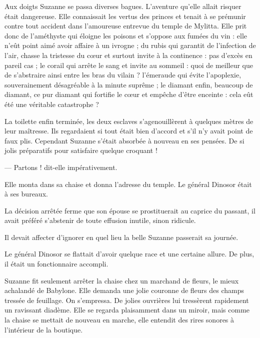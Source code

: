 \documentclass[a4paper, 11pt, oneside, polutonikogreek, french]{article}
\begin{document}
Aux doigts Suzanne se passa diverses bagues. L'aventure qu'elle allait risquer était dangereuse. Elle connaissait les vertus des princes et tenait à se prémunir contre tout accident dans l'amoureuse entrevue du temple de Mylitta. Elle prit donc de l'améthyste qui éloigne les poisons et s'oppose aux fumées du vin : elle n'eût point aimé avoir affaire à un ivrogne ; du rubis qui garantit de l'infection de l'air, chasse la tristesse du cœur et surtout invite à la continence : pas d'excès en pareil cas ; le corail qui arrête le sang et invite au sommeil : quoi de meilleur que de s'abstraire ainsi entre les bras du vilain ? l'émeraude qui évite l'apoplexie, souverainement désagréable à la minute suprême ; le diamant enfin, beaucoup de diamant, ce pur diamant qui fortifie le cœur et empêche d'être enceinte : cela eût été une véritable catastrophe ?

\bigskip
\centerline{\EightStarTaper}
\centerline{\EightStarTaper\EightStarTaper}
\bigskip

La toilette enfin terminée, les deux esclaves s'agenouillèrent à quelques mètres de leur maîtresse. Ils regardaient si tout était bien d'accord et s'il n'y avait point de faux plis. Cependant Suzanne s'était absorbée à nouveau en ses pensées. De si jolis préparatifs pour satisfaire quelque croquant !

--- Partons ! dit-elle impérativement.

\bigskip
\centerline{\EightStarTaper}
\centerline{\EightStarTaper\EightStarTaper}
\bigskip

Elle monta dans sa chaise et donna l'adresse du temple. Le général Dinosor était à ses bureaux.

La décision arrêtée ferme que son épouse se prostituerait au caprice du passant, il avait préféré s'abstenir de toute effusion inutile, sinon ridicule.

Il devait affecter d'ignorer en quel lieu la belle Suzanne passerait sa journée.

Le général Dinosor se flattait d'avoir quelque race et une certaine allure. De plus, il était un fonctionnaire accompli.

\bigskip
\centerline{\EightStarTaper}
\centerline{\EightStarTaper\EightStarTaper}
\bigskip

Suzanne fit seulement arrêter la chaise chez un marchand de fleurs, le mieux achalandé de Babylone. Elle demanda une jolie couronne de fleurs des champs tressée de feuillage. On s'empressa. De jolies ouvrières lui tressèrent rapidement un ravissant diadème. Elle se regarda plaisamment dans un miroir, mais comme la chaise se mettait de nouveau en marche, elle entendit des rires sonores à l'intérieur de la boutique.
\end{document}
